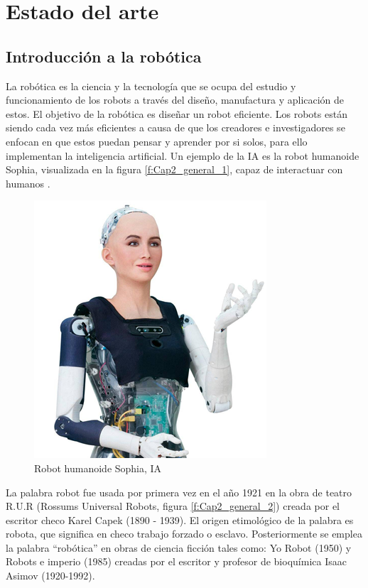 \chapter{Estado del arte}\label{CAP2}


\section{Introducción a la robótica}
    La robótica es la ciencia y la tecnología que se ocupa del estudio y funcionamiento de los robots a través del diseño, manufactura y aplicación de estos. El objetivo de la robótica es diseñar un robot eficiente. Los robots están siendo cada vez más eficientes a causa de que los creadores e investigadores se enfocan en que estos puedan pensar y aprender por si solos, para ello implementan la inteligencia artificial. Un ejemplo de la IA es la robot humanoide Sophia, visualizada en la figura \eqref{f:Cap2_general_1}, capaz de interactuar con humanos .
    
    \begin{figure}[htb]
        \centering
        \includegraphics[width=0.3\linewidth]{Main/Chapter2/Images2/Robot-humanoideSophiaIA.png}
        \caption{Robot humanoide Sophia, IA \cite{robot_sofi}} 
        \label{f:Cap2_general_1}
    \end{figure}   
    
    La palabra robot fue usada por primera vez en el año 1921 en la obra de teatro R.U.R (Rossums Universal Robots, figura \eqref{f:Cap2_general_2}) creada por el escritor checo Karel Capek (1890 - 1939). El origen etimológico de la palabra es robota, que significa en checo trabajo forzado o esclavo. Posteriormente se emplea la palabra ``robótica'' en obras de ciencia ficción tales como: Yo Robot (1950) y Robots e imperio (1985) creadas por el escritor y profesor de bioquímica Isaac Asimov (1920-1992).
    
    \newpage
    
